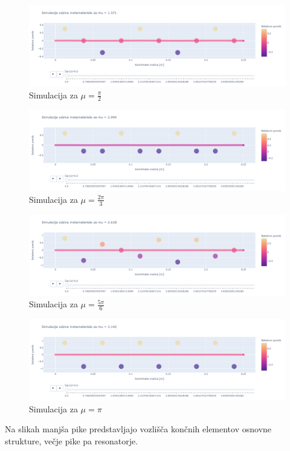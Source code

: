 \documentclass[12pt]{report}
\begin{document}
\begin{figure}[H]
  \centering
  \includegraphics[trim={0 4cm 0 3.5cm},clip, scale=0.3]{Images/mupi_2.png}
  \caption{Simulacija za $\mu = \frac{\pi}{2}$}
\end{figure}
\begin{figure}[H]
  \centering
  \includegraphics[trim={0 4cm 0 3.5cm},clip, scale=0.3]{Images/mu2pi_3.png}
  \caption{Simulacija za $\mu = \frac{2\pi}{3}$}
\end{figure}
\begin{figure}[H]
  \centering
  \includegraphics[trim={0 4cm 0 3.5cm},clip, scale=0.3]{Images/mu5pi_6.png}
  \caption{Simulacija za $\mu = \frac{5\pi}{6}$}
\end{figure}
\begin{figure}[H]
  \centering
  \includegraphics[trim={0 4cm 0 3.5cm},clip, scale=0.3]{Images/mupi.png}
  \caption{Simulacija za $\mu = \pi$}
\end{figure}
\noindent Na slikah manjša pike predstavljajo vozlišča končnih elementov osnovne strukture, večje pike pa resonatorje.



\printbibliography[title={Literatura}]
\end{document}
